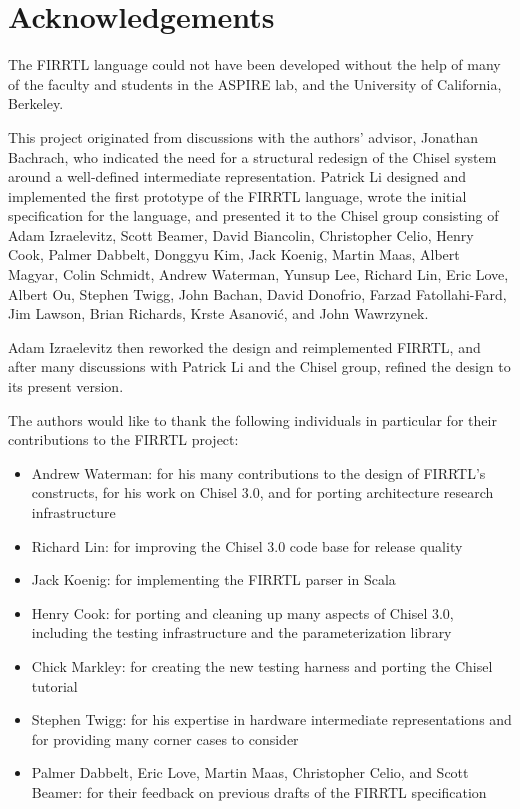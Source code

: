 \documentclass[12pt]{article}
\begin{document}
\section{Acknowledgements}
The FIRRTL language could not have been developed without the help of many of the faculty and students in the ASPIRE lab, and the University of California, Berkeley.

This project originated from discussions with the authors' advisor, Jonathan Bachrach, who indicated the need for a structural redesign of the Chisel system around a well-defined intermediate representation. Patrick Li designed and implemented the first prototype of the FIRRTL language, wrote the initial specification for the language, and presented it to the Chisel group consisting of Adam Izraelevitz, Scott Beamer, David Biancolin, Christopher Celio, Henry Cook, Palmer Dabbelt, Donggyu Kim, Jack Koenig, Martin Maas, Albert Magyar, Colin Schmidt, Andrew Waterman, Yunsup Lee, Richard Lin, Eric Love, Albert Ou, Stephen Twigg, John Bachan, David Donofrio, Farzad Fatollahi-Fard, Jim Lawson, Brian Richards, Krste Asanovi\'c, and John Wawrzynek.

Adam Izraelevitz then reworked the design and reimplemented FIRRTL, and after many discussions with Patrick Li and the Chisel group, refined the design to its present version.

The authors would like to thank the following individuals in particular for their contributions to the FIRRTL project:
\begin{itemize}
\item Andrew Waterman: for his many contributions to the design of FIRRTL's constructs, for his work on Chisel 3.0, and for porting architecture research infrastructure
\item Richard Lin: for improving the Chisel 3.0 code base for release quality
\item Jack Koenig: for implementing the FIRRTL parser in Scala
\item Henry Cook: for porting and cleaning up many aspects of Chisel 3.0, including the testing infrastructure and the parameterization library
\item Chick Markley: for creating the new testing harness and porting the Chisel tutorial
\item Stephen Twigg: for his expertise in hardware intermediate representations and for providing many corner cases to consider
\item Palmer Dabbelt, Eric Love, Martin Maas, Christopher Celio, and Scott Beamer: for their feedback on previous drafts of the FIRRTL specification
\end{itemize}
\end{document}
